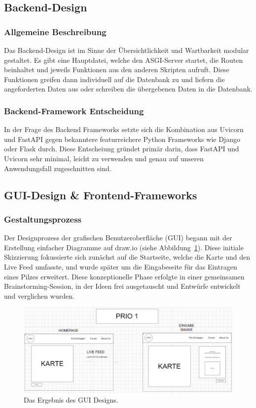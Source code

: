 \subsection{Backend-Design}

\subsubsection{Allgemeine Beschreibung}

Das Backend-Design ist im Sinne der Übersichtlichkeit und Wartbarkeit modular gestaltet. Es gibt eine Hauptdatei, welche den ASGI-Server startet, die Routen
beinhaltet und jeweils Funktionen aus den anderen Skripten aufruft. Diese Funktionen greifen dann individuell auf die Datenbank zu und liefern die angeforderten
Daten aus oder schreiben die übergebenen Daten in die Datenbank.

\subsubsection{Backend-Framework Entscheidung}

In der Frage des Backend Frameworks setzte sich die Kombination aus Uvicorn und FastAPI gegen bekanntere featurreichere Python Frameworks wie Django oder Flask
durch. Diese Entscheiung gründet primär darin, dass FastAPI und Uvicorn sehr minimal, leicht zu verwenden und genau auf unseren Anwendungsfall zugeschnitten sind.

\subsection{GUI-Design \& Frontend-Frameworks}

\subsubsection{Gestaltungsprozess}

Der Designprozess der grafischen Benutzeroberfläche (GUI) begann mit der Erstellung einfacher Diagramme auf draw.io
(siehe Abbildung~\ref{fig:GUI_Entwurf}). Diese initiale Skizzierung fokussierte sich zunächst auf die Startseite, welche
die Karte und den Live Feed umfasste, und wurde später um die Eingabeseite für das Eintragen eines Pilzes erweitert. Diese
konzeptionelle Phase erfolgte in einer gemeinsamen Brainstorming-Session, in der Ideen frei ausgetauscht und Entwürfe
entwickelt und verglichen wurden.

\begin{figure}[ht]
	\centering
	\includegraphics[width=\textwidth]{abbildungen/GuiEntwurfDrawio.jpg}
	\caption{Das Ergebnis des GUI Designs.}
	\label{fig:GUI_Entwurf}
\end{figure}

